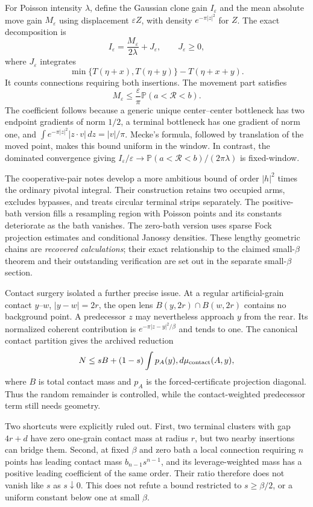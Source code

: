 \documentclass[11pt,a4paper]{article}
\theoremstyle{definition}
\theoremstyle{remark}
\numberwithin{equation}{section}
\begin{document}
For Poisson intensity $\lambda$, define the Gaussian clone gain $I_\varepsilon$
and the mean absolute move gain $M_\varepsilon$ using displacement
$\varepsilon Z$, with density $e^{-\pi|z|^2}$ for $Z$.  The exact
decomposition is
\begin{equation}
 I_\varepsilon=\frac{M_\varepsilon}{2\lambda}+J_\varepsilon,
 \qquad J_\varepsilon\geq0,
 \label{br:clone-decomp}
\end{equation}
where $J_\varepsilon$ integrates
\[
 \min\{T(\eta+x),T(\eta+y)\}-T(\eta+x+y).
\]
It counts connections requiring both insertions.  The movement part
satisfies
\[
 M_\varepsilon\leq\frac{\varepsilon}{\pi}
          \mathbb P(a<\mathcal R<b).
\]
The coefficient follows because a generic unique center--center
bottleneck has two endpoint gradients of norm $1/2$, a terminal
bottleneck has one gradient of norm one, and
$\int e^{-\pi|z|^2}|z\cdot v|\,dz=|v|/\pi$.
Mecke's formula, followed by translation of the moved point, makes this
bound uniform in the window.  In contrast, the dominated convergence
giving
$I_\varepsilon/\varepsilon\to
\mathbb P(a<\mathcal R<b)/(2\pi\lambda)$ is fixed-window.

The cooperative-pair notes develop a more ambitious bound of order
$|h|^2$ times the ordinary pivotal integral.  Their construction retains
two occupied arms, excludes bypasses, and treats circular terminal
strips separately.  The positive-bath version fills a resampling region
with Poisson points and its constants deteriorate as the bath vanishes.
The zero-bath version uses sparse Fock projection estimates and
conditional Janossy densities.  These lengthy geometric chains are
\emph{recovered calculations}; their exact relationship to the claimed
small-$\beta$ theorem and their outstanding verification are set out in
the separate small-$\beta$ section.

Contact surgery isolated a further precise issue.  At a regular
artificial-grain contact $y$--$w$, $|y-w|=2r$, the open lens
$B(y,2r)\cap B(w,2r)$ contains no background point.  A predecessor $z$
may nevertheless approach $y$ from the rear.  Its normalized coherent
contribution is $e^{-\pi|z-y|^2/\beta}$ and tends to one.  The
canonical contact partition gives the archived reduction
\[
 N\leq sB+(1-s)\int p_A(y),d\mu_{\rm contact}(A,y),
\]
where $B$ is total contact mass and $p_A$ is the forced-certificate
projection diagonal.  Thus the random remainder is controlled, while
the contact-weighted predecessor term still needs geometry.

Two shortcuts were explicitly ruled out.  First, two terminal clusters
with gap $4r+d$ have zero one-grain contact mass at radius $r$, but two
nearby insertions can bridge them.  Second, at fixed $\beta$ and zero
bath a local connection requiring $n$ points has leading contact mass
$b_{n-1}s^{n-1}$, and its leverage-weighted mass has a positive leading
coefficient of the same order.  Their ratio therefore does not vanish
like $s$ as $s\downarrow0$.  This does not refute a bound restricted to
$s\geq\beta/2$, or a uniform constant below one at small $\beta$.
\end{document}
